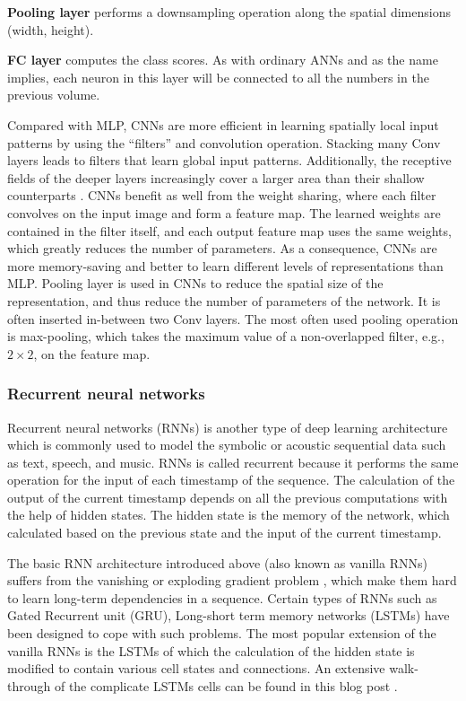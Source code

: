 \noindent\textbf{Pooling layer} performs a downsampling operation along the spatial dimensions (width, height).

\noindent\textbf{FC layer} computes the class scores. As with ordinary ANNs and as the name implies, each neuron in this layer will be connected to all the numbers in the previous volume.

Compared with MLP, CNNs are more efficient in learning spatially local input patterns by using the ``filters” and convolution operation. Stacking many Conv layers leads to filters that learn global input patterns. Additionally, the receptive fields of the deeper layers increasingly cover a larger area than their shallow counterparts \cite{Wikipediaa}. CNNs benefit as well from the weight sharing, where each filter convolves on the input image and form a feature map. The learned weights are contained in the filter itself, and each output feature map uses the same weights, which greatly reduces the number of parameters. As a consequence, CNNs are more memory-saving and better to learn different levels of representations than MLP.
Pooling layer is used in CNNs to reduce the spatial size of the representation, and thus reduce the number of parameters of the network. It is often inserted in-between two Conv layers. The most often used pooling operation is max-pooling, which takes the maximum value of a non-overlapped filter, e.g., $2\times2$, on the feature map. 

\subsubsection{Recurrent neural networks}\label{sec:ch2:rnn}

Recurrent neural networks (RNNs) is another type of deep learning architecture which is commonly used to model the symbolic or acoustic sequential data such as text, speech, and music. RNNs is called recurrent because it performs the same operation for the input of each timestamp of the sequence. The calculation of the output of the current timestamp depends on all the previous computations with the help of hidden states. The hidden state is the memory of the network, which calculated based on the previous state and the input of the current timestamp. 

The basic RNN architecture introduced above (also known as vanilla RNNs) suffers from the vanishing or exploding gradient problem \cite{Pascanu2013}, which make them hard to learn long-term dependencies in a sequence. Certain types of RNNs such as Gated Recurrent unit (GRU), Long-short term memory networks (LSTMs) have been designed to cope with such problems. The most popular extension of the vanilla RNNs is the LSTMs \cite{Hochreiter1997} of which the calculation of the hidden state is modified to contain various cell states and connections. An extensive walk-through of the complicate LSTMs cells can be found in this blog post \cite{Olah2015}. 

